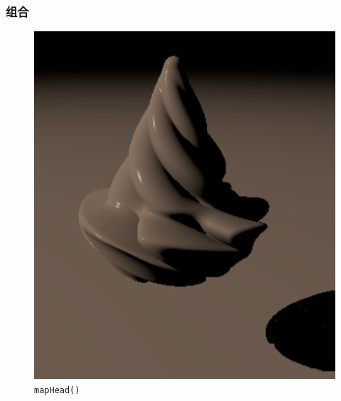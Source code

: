 \documentclass[aspectratio=169]{ctexbeamer} %
\begin{document}
\begin{frame}
    \frametitle{组合}
    \begin{figure}[htbp]
        \centering
        \includegraphics[height=.75\textheight]{images/pre/head/cream.pdf}
        \caption{\texttt{mapHead()}}
        \label{fig:cream}
    \end{figure}
\end{frame}
\end{document}
